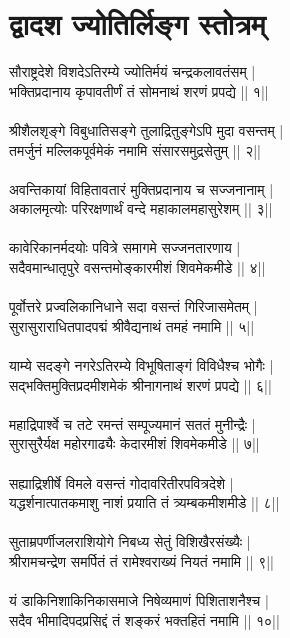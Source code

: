 \section{\sanskrit द्वादश ज्योतिर्लिङ्ग स्तोत्रम् }
\chandas
सौराष्ट्रदेशे विशदेऽतिरम्ये ज्योतिर्मयं चन्द्रकलावतंसम् |\\
भक्तिप्रदानाय कृपावतीर्णं तं सोमनाथं शरणं प्रपद्ये || १||\\
\\
श्रीशैलशृङ्गे विबुधातिसङ्गे तुलाद्रितुङ्गेऽपि मुदा वसन्तम् |\\
तमर्जुनं मल्लिकपूर्वमेकं नमामि संसारसमुद्रसेतुम् || २||\\
\\
अवन्तिकायां विहितावतारं मुक्तिप्रदानाय च सज्जनानाम् |\\
अकालमृत्योः परिरक्षणार्थं वन्दे महाकालमहासुरेशम् || ३||\\
\\
कावेरिकानर्मदयोः पवित्रे समागमे सज्जनतारणाय |\\
सदैवमान्धातृपुरे वसन्तमोङ्कारमीशं शिवमेकमीडे || ४||\\
\\
पूर्वोत्तरे प्रज्वलिकानिधाने सदा वसन्तं गिरिजासमेतम् |\\
सुरासुराराधितपादपद्मं श्रीवैद्यनाथं तमहं नमामि || ५||\\
\\
याम्ये सदङ्गे नगरेऽतिरम्ये विभूषिताङ्गं विविधैश्च भोगैः |\\
सद्भक्तिमुक्तिप्रदमीशमेकं श्रीनागनाथं शरणं प्रपद्ये || ६||\\
\\
महाद्रिपार्श्वे च तटे रमन्तं सम्पूज्यमानं सततं मुनीन्द्रैः |\\
सुरासुरैर्यक्ष महोरगाढ्यैः केदारमीशं शिवमेकमीडे || ७||\\
\\
सह्याद्रिशीर्षे विमले वसन्तं गोदावरितीरपवित्रदेशे |\\
यद्धर्शनात्पातकमाशु नाशं प्रयाति तं त्र्यम्बकमीशमीडे || ८||\\
\\
सुताम्रपर्णीजलराशियोगे निबध्य सेतुं विशिखैरसंख्यैः |\\
श्रीरामचन्द्रेण समर्पितं तं रामेश्वराख्यं नियतं नमामि || ९||\\
\\
यं डाकिनिशाकिनिकासमाजे निषेव्यमाणं पिशिताशनैश्च |\\
सदैव भीमादिपदप्रसिद्दं तं शङ्करं भक्तहितं नमामि || १०||\\
\\
